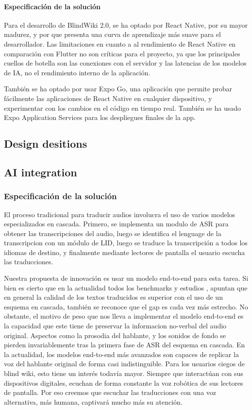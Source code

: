 \paragraph{Especificación de la solución}
Para el desarrollo de BlindWiki 2.0, se ha optado por React Native, por su mayor madurez, y por que presenta una curva de aprendizaje más suave para el desarrollador. Las limitaciones en cuanto a al rendimiento de React Native en comparación con Flutter no son críticas para el proyecto, ya que los principales cuellos de botella son las conexiones con el servidor y las latencias de los modelos de IA, no el rendimiento interno de la aplicación.

También se ha optado por usar Expo Go, una aplicación que permite probar fácilmente las aplicaciones de React Native en cualquier dispositivo, y experimentar con los cambios en el código en tiempo real. También se ha usado Expo Application Services para los despliegues finales de la app.   

\subsection{Design desitions}
\subsection{AI integration}

\subsubsection{Especificación de la solución}

El proceso tradicional para traducir audios involucra el uso de varios modelos especializados en cascada. Primero, se implementa un modulo de ASR para obtener las transcripciones del audio, luego se identifica el lenguage de la transcripcion con un módulo de LID, luego se traduce la transcripción a todos los idiomas de destino, y finalmente mediante lectores de pantalla el usuario escucha las traducciones.

Nuestra propuesta de innovación es usar un modelo end-to-end para esta tarea. Si bien es cierto que en la actualidad todos los benchmarks \cite{iwslt-findings} y estudios \cite{etchegoyhen2022cascade}, \cite{Sethiya2025} apuntan que en general la calidad de los textos traducidos es superior con el uso de un esquema en cascada, también se reconoce que el gap es cada vez más estrecho.
No obstante, el motivo de peso que nos lleva a implementar el modelo end-to-end es la capacidad que este tiene de preservar la informacion no-verbal del audio original. Aspectos como la prosodia del hablante, y los sonidos de fondo se pierden invariablemente tras la primera fase de ASR del esquema en cascada. En la actualidad, los modelos end-to-end más avanzados son capaces de replicar la voz del hablante original de forma casi indistinguible.  
Para los usuarios ciegos de blind wiki, esto tiene un interés todavía mayor. Siempre que interactúan con sus dispositivos digitales, ecuchan de forma constante la voz robótica de sus lectores de pantalla. Por eso creemos que escuchar las traducciones con una voz alternativa, más humana, captivará mucho más su atención. 


